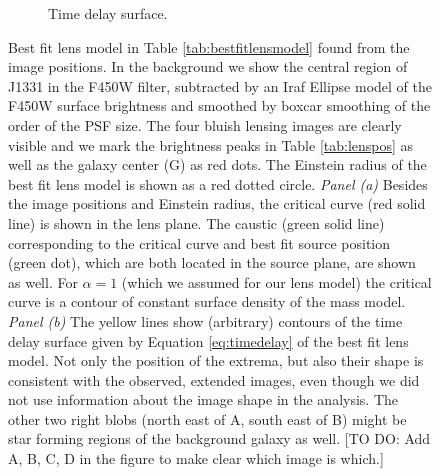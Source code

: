 \begin{figure}
\begin{subfigure}{.5\textwidth}
  \caption{Time delay surface.}
  \label{fig:lensbestfittimedelay}
\end{subfigure}
\caption{Best fit lens model in Table \ref{tab:bestfitlensmodel} found from the image positions. In the background we show the central region of J1331 in the F450W filter, subtracted by an Iraf Ellipse model of the F450W surface brightness and smoothed by boxcar smoothing of the order of the PSF size. The four bluish lensing images are clearly visible and we mark the brightness peaks in Table \ref{tab:lenspos} as well as the galaxy center (G) as red dots. The Einstein radius of the best fit lens model is shown as a red dotted circle. \emph{Panel (a)} Besides the image positions and Einstein radius, the critical curve (red solid line) is shown in the lens plane. The caustic (green solid line) corresponding to the critical curve and best fit source position (green dot), which are both located in the source plane, are shown as well. For $\alpha=1$ (which we assumed for our lens model) the critical curve is a contour of constant surface density of the mass model. \emph{Panel (b)} The yellow lines show (arbitrary) contours of the time delay surface given by Equation \ref{eq:timedelay} of the best fit lens model. Not only the position of the extrema, but also their shape is consistent with the observed, extended images, even though we did not use information about the image shape in the analysis. The other two right blobs (north east of A, south east of B) might be star forming regions of the background galaxy as well. [TO DO: Add A, B, C, D in the figure to make clear which image is which.]}
\label{fig:???}
\end{figure}



